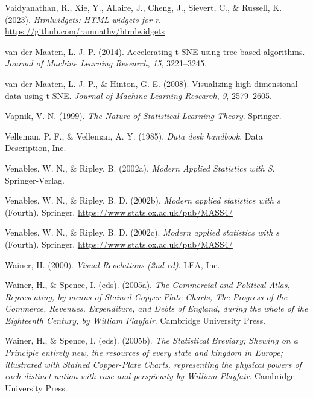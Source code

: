 \documentclass[
  letterpaper,
]{krantz}
\newlength{\cslhangindent}
\newenvironment{CSLReferences}[2] %
 {\begin{list}{}{%
  \setlength{\itemindent}{0pt}
  \setlength{\leftmargin}{0pt}
  \setlength{\parsep}{0pt}
  \ifodd #1
   \setlength{\leftmargin}{\cslhangindent}
   \setlength{\itemindent}{-1\cslhangindent}
  \fi
  \setlength{\itemsep}{#2\baselineskip}}}
 {\end{list}}
\begin{document}
\begin{CSLReferences}{1}{0}
Vaidyanathan, R., Xie, Y., Allaire, J., Cheng, J., Sievert, C., \&
Russell, K. (2023). \emph{Htmlwidgets: HTML widgets for r}.
\url{https://github.com/ramnathv/htmlwidgets}

van der Maaten, L. J. P. (2014). Accelerating t-SNE using tree-based
algorithms. \emph{Journal of Machine Learning Research}, \emph{15},
3221--3245.

van der Maaten, L. J. P., \& Hinton, G. E. (2008). Visualizing
high-dimensional data using t-SNE. \emph{Journal of Machine Learning
Research}, \emph{9}, 2579--2605.

Vapnik, V. N. (1999). \emph{The {N}ature of {S}tatistical {L}earning
{T}heory}. Springer.

Velleman, P. F., \& Velleman, A. Y. (1985). \emph{Data desk handbook}.
Data Description, Inc.

Venables, W. N., \& Ripley, B. (2002a). \emph{Modern {A}pplied
{S}tatistics with {S}}. Springer-Verlag.

Venables, W. N., \& Ripley, B. D. (2002b). \emph{Modern applied
statistics with s} (Fourth). Springer.
\url{https://www.stats.ox.ac.uk/pub/MASS4/}

Venables, W. N., \& Ripley, B. D. (2002c). \emph{Modern applied
statistics with s} (Fourth). Springer.
\url{https://www.stats.ox.ac.uk/pub/MASS4/}

Wainer, H. (2000). \emph{Visual {R}evelations (2nd ed)}. LEA, Inc.

Wainer, H., \& Spence, I. (eds). (2005a). \emph{The {C}ommercial and
{P}olitical {A}tlas, {R}epresenting, by means of {S}tained
{C}opper-{P}late {C}harts, {T}he {P}rogress of the {C}ommerce,
{R}evenues, {E}xpenditure, and {D}ebts of {E}ngland, during the whole of
the {E}ighteenth {C}entury, by {W}illiam {P}layfair}. Cambridge
University Press.

Wainer, H., \& Spence, I. (eds). (2005b). \emph{The {S}tatistical
{B}reviary; {S}hewing on a {P}rinciple entirely new, the resources of
every state and kingdom in {E}urope; illustrated with {S}tained
{C}opper-{P}late {C}harts, representing the physical powers of each
distinct nation with ease and perspicuity by {W}illiam {P}layfair}.
Cambridge University Press.


\end{CSLReferences}
\end{document}
